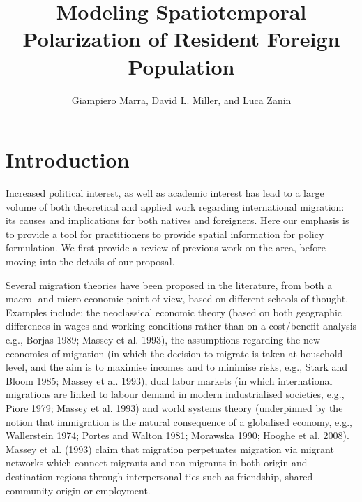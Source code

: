 \documentclass[10pt] {article}
\theoremstyle{definition}
\theoremstyle{plain}
\begin{document}
\title{Modeling Spatiotemporal Polarization of Resident Foreign Population}

\author{Giampiero Marra, David L. Miller, and Luca Zanin
}

\maketitle








\section{Introduction \label{IN}}

Increased political interest, as well as academic interest has lead to a large volume of both theoretical and applied work regarding international migration: its causes and implications for both natives and foreigners. Here our emphasis is to provide a tool for practitioners to provide spatial information for policy formulation. We first provide a review of previous work on the area, before moving into the details of our proposal.

Several migration theories have been proposed in the literature, from both a macro- and micro-economic point of view, based on different schools of thought. Examples include: the neoclassical economic theory (based on both geographic differences in wages and working conditions rather than on a cost/benefit analysis e.g., Borjas 1989; Massey et al. 1993), the assumptions regarding the new economics of migration (in which the decision to migrate is taken at household level, and the aim is to maximise incomes and to minimise risks, e.g., Stark and Bloom 1985; Massey et al. 1993), dual labor markets (in which international migrations are linked to labour demand in modern industrialised societies, e.g., Piore 1979; Massey et al. 1993) and world systems theory (underpinned by the notion that immigration is the natural consequence of a globalised economy, e.g., Wallerstein 1974; Portes and Walton 1981; Morawska 1990; Hooghe et al. 2008). Massey et al. (1993) claim that migration perpetuates migration via migrant networks which connect migrants and non-migrants in both origin and destination regions through interpersonal ties such as friendship, shared community origin or employment.
\end{document}
